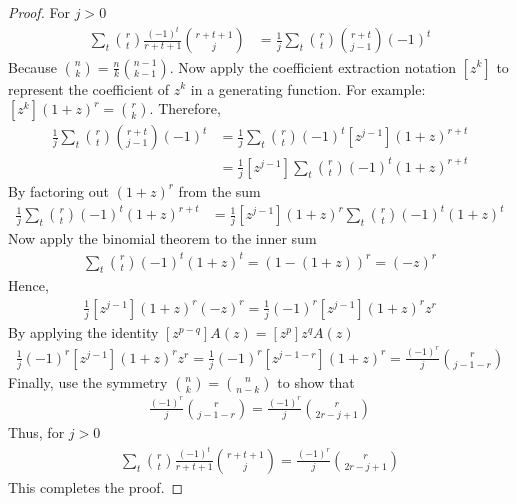 \begin{lemma}
\begin{proof}
        For $j > 0$
        \begin{align*}
            \sum_t \binom{r}{t} \frac{(-1)^t}{r+t+1} \binom{r+t+1}{j}
            &= \frac{1}{j} \sum_t \binom{r}{t} \binom{r+t}{j-1} (-1)^t
        \end{align*}
        Because $\binom{n}{k} = \frac{n}{k} \binom{n-1}{k-1}$.
        Now apply the coefficient extraction notation $[z^k]$ to represent the coefficient of $z^k$
        in a generating function.
        For example: $[z^k] (1+z)^r = \binom{r}{k}$.
        Therefore,
        \begin{align*}
            \frac{1}{j} \sum_t \binom{r}{t} \binom{r+t}{j-1} (-1)^t
            &= \frac{1}{j} \sum_t \binom{r}{t} (-1)^t [z^{j-1}] (1+z)^{r+t} \\
            &= \frac{1}{j} [z^{j-1}] \sum_t \binom{r}{t} (-1)^t (1+z)^{r+t}
        \end{align*}
        By factoring out $(1+z)^r$ from the sum
        \begin{align*}
        [z^{j-1}]
            \frac{1}{j} \sum_t \binom{r}{t} (-1)^t (1+z)^{r+t}
            &= \frac{1}{j} [z^{j-1}] (1+z)^r \sum_t \binom{r}{t} (-1)^t (1+z)^t
        \end{align*}
        Now apply the binomial theorem to the inner sum
        \begin{align*}
            \sum_t \binom{r}{t} (-1)^t (1+z)^t = \left(1 - (1+z)\right)^r = (-z)^r
        \end{align*}
        Hence,
        \begin{align*}
            \frac{1}{j} [z^{j-1}] (1+z)^r (-z)^r = \frac{1}{j} (-1)^r [z^{j-1}] (1+z)^r z^r
        \end{align*}
        By applying the identity $[z^{p-q}]A(z)=[z^p]z^qA(z)$
        \begin{align*}
            \frac{1}{j} (-1) ^r [z^{j-1}] (1+z)^r z^r = \frac{1}{j} (-1)^r [z^{j-1-r}] (1+z)^r = \frac{(-1)^r}{j} \binom{r}{j - 1 - r}
        \end{align*}
        Finally, use the symmetry $\binom{n}{k} = \binom{n}{n-k}$ to show that
        \begin{align*}
            \frac{(-1)^r}{j} \binom{r}{j - 1 - r} = \frac{(-1)^r}{j} \binom{r}{2r - j + 1}
        \end{align*}
        Thus, for $j > 0$
        \begin{align*}
            \sum_t \binom{r}{t} \frac{(-1)^t}{r+t+1} \binom{r+t+1}{j}
            = \frac{(-1)^r}{j} \binom{r}{2r - j + 1}
        \end{align*}
        This completes the proof.
    \end{proof}
\end{lemma}

